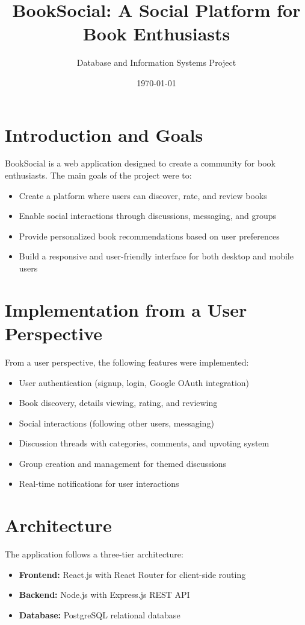 \documentclass{article}
\title{BookSocial: A Social Platform for Book Enthusiasts}
\author{Database and Information Systems Project}
\date{\today}
\begin{document}
\maketitle

\section{Introduction and Goals}
BookSocial is a web application designed to create a community for book enthusiasts. The main goals of the project were to:
\begin{itemize}
    \item Create a platform where users can discover, rate, and review books
    \item Enable social interactions through discussions, messaging, and groups
    \item Provide personalized book recommendations based on user preferences
    \item Build a responsive and user-friendly interface for both desktop and mobile users
\end{itemize}

\section{Implementation from a User Perspective}
From a user perspective, the following features were implemented:
\begin{itemize}
    \item User authentication (signup, login, Google OAuth integration)
    \item Book discovery, details viewing, rating, and reviewing
    \item Social interactions (following other users, messaging)
    \item Discussion threads with categories, comments, and upvoting system
    \item Group creation and management for themed discussions
    \item Real-time notifications for user interactions
\end{itemize}

\section{Architecture}
The application follows a three-tier architecture:
\begin{itemize}
    \item \textbf{Frontend:} React.js with React Router for client-side routing
    \item \textbf{Backend:} Node.js with Express.js REST API
    \item \textbf{Database:} PostgreSQL relational database
\end{itemize}
\end{document}
